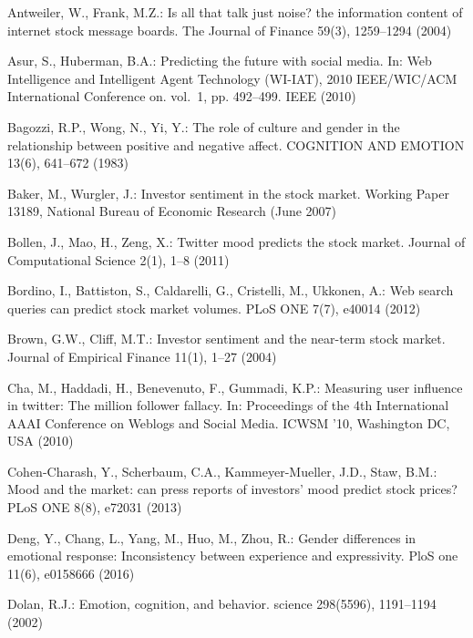 \documentclass[aps,preprint,groupedaddress]{revtex4-1}
\begin{document}
\begin{thebibliography}{10}
\providecommand{\url}[1]{\texttt{#1}}
\providecommand{\urlprefix}{URL }

Antweiler, W., Frank, M.Z.: Is all that talk just noise? the information
  content of internet stock message boards. The Journal of Finance  59(3),
  1259--1294 (2004)

Asur, S., Huberman, B.A.: Predicting the future with social media. In: Web
  Intelligence and Intelligent Agent Technology (WI-IAT), 2010 IEEE/WIC/ACM
  International Conference on. vol.~1, pp. 492--499. IEEE (2010)

Bagozzi, R.P., Wong, N., Yi, Y.: The role of culture and gender in the
  relationship between positive and negative affect. COGNITION AND EMOTION
  13(6),  641--672 (1983)

Baker, M., Wurgler, J.: Investor sentiment in the stock market. Working Paper
  13189, National Bureau of Economic Research (June 2007)

Bollen, J., Mao, H., Zeng, X.: Twitter mood predicts the stock market. Journal
  of Computational Science  2(1),  1--8 (2011)

Bordino, I., Battiston, S., Caldarelli, G., Cristelli, M., Ukkonen, A.: Web
  search queries can predict stock market volumes. PLoS ONE  7(7),  e40014
  (2012)

Brown, G.W., Cliff, M.T.: Investor sentiment and the near-term stock market.
  Journal of Empirical Finance  11(1),  1--27 (2004)

Cha, M., Haddadi, H., Benevenuto, F., Gummadi, K.P.: Measuring user influence
  in twitter: The million follower fallacy. In: Proceedings of the 4th
  International AAAI Conference on Weblogs and Social Media. ICWSM '10,
  Washington DC, USA (2010)

Cohen-Charash, Y., Scherbaum, C.A., Kammeyer-Mueller, J.D., Staw, B.M.: Mood
  and the market: can press reports of investors' mood predict stock prices?
  PLoS ONE 8(8), e72031 (2013)

Deng, Y., Chang, L., Yang, M., Huo, M., Zhou, R.: Gender differences in
  emotional response: Inconsistency between experience and expressivity. PloS
  one  11(6),  e0158666 (2016)

Dolan, R.J.: Emotion, cognition, and behavior. science  298(5596),  1191--1194
  (2002)


\end{thebibliography}
\end{document}
